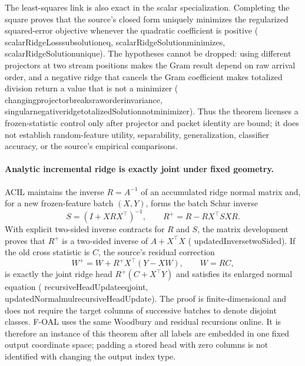 \documentclass[11pt]{article}
\newcommand{\leanname}[1]{{\scriptsize\ttfamily
  \def\_{\textunderscore\allowbreak}#1}}
\begin{document}
The least-squares link is also exact in the scalar specialization. Completing
the square proves that the source's closed form uniquely minimizes the
regularized squared-error objective whenever the quadratic coefficient is
positive
(\leanname{scalarRidgeLoss\_sub\_solution\_eq},
\leanname{scalarRidgeSolution\_minimizes},
\leanname{scalarRidgeSolution\_unique}). The hypotheses cannot be dropped:
using different projectors at two stream positions makes the Gram result
depend on raw arrival order, and a negative ridge that cancels the Gram
coefficient makes totalized division return a value that is not a minimizer
(\leanname{changing\_projector\_breaks\_raw\_order\_invariance},
\leanname{singular\_negative\_ridge\_totalizedSolution\_not\_minimizer}).
Thus the theorem licenses a frozen-statistic control only after projector and
packet identity are bound; it does not establish random-feature utility,
separability, generalization, classifier accuracy, or the source's empirical
comparisons.

\paragraph{Analytic incremental ridge is exactly joint under fixed geometry.}
ACIL \cite{zhuang2022acil} maintains the inverse $R=A^{-1}$ of an
accumulated ridge normal matrix and, for a new frozen-feature batch $(X,Y)$,
forms the batch Schur inverse
\[
  S=(I+XRX^\top)^{-1},\qquad
  R^+=R-RX^\top SXR .
\]
With explicit two-sided inverse contracts for $R$ and $S$, the matrix
development proves that $R^+$ is a two-sided inverse of
$A+X^\top X$
(\leanname{updatedInverse\_twoSided}). If the old cross statistic is $C$,
the source's residual correction
\[
  W^+=W+R^+X^\top(Y-XW),\qquad W=RC ,
\]
is exactly the joint ridge head
$R^+(C+X^\top Y)$ and satisfies its enlarged normal equation
(\leanname{recursiveHeadUpdate\_eq\_joint},
\leanname{updatedNormal\_mul\_recursiveHeadUpdate}). The proof is
finite-dimensional and does not require the target columns of successive
batches to denote disjoint classes.
F-OAL \cite{zhuang2024foal} uses the same Woodbury and residual recursions
online. It is therefore an instance of this theorem after all labels are
embedded in one fixed output coordinate space; padding a stored head with
zero columns is not identified with changing the output index type.
\end{document}
